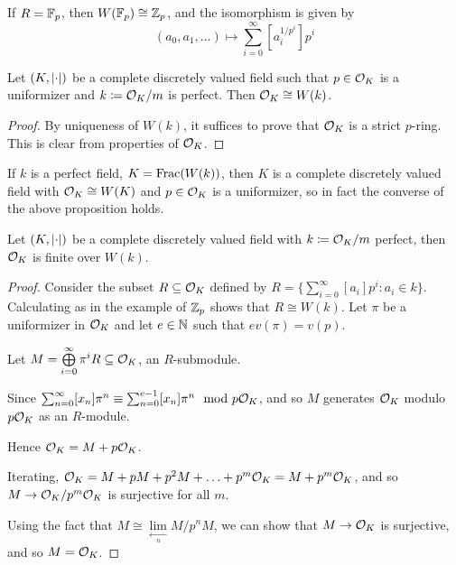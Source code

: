 \documentclass[10pt,a4paper]{article}
\begin{document}
If $R = \mathbb{F}_p$, then $W(\mathbb{F}_p) \cong \mathbb{Z}_p$, and the isomorphism is given by
\[(a_0, a_1, \ldots) \mapsto \sum_{i=0}^\infty \left[a_i^{1/p^i}\right]p^i\]

\begin{proposition}
  Let $(K, \lvert\cdot\rvert)$ be a complete discretely valued field such that $p \in \mathcal{O}_K$ is a uniformizer and $k \coloneqq \mathcal{O}_K/m$ is perfect. Then $\mathcal{O}_K \cong W(k)$.
\end{proposition}
\begin{proof}
  By uniqueness of $W(k)$, it suffices to prove that $\mathcal{O}_K$ is a strict $p$-ring. This is clear from properties of $\mathcal{O}_K$.
\end{proof}

If $k$ is a perfect field, $K = \operatorname{Frac}(W(k))$, then $K$ is a complete discretely valued field with $\mathcal{O}_K \cong W(K)$ and $p \in \mathcal{O}_K$ is a uniformizer, so in fact the converse of the above proposition holds.

\begin{proposition}
  Let $(K, \lvert\cdot\rvert)$ be a complete discretely valued field with $k \coloneqq \mathcal{O}_K/m$ perfect, then $\mathcal{O}_K$ is finite over $W(k)$.
\end{proposition}
\begin{proof}
  Consider the subset $R \subseteq \mathcal{O}_K$ defined by $R = \{\sum_{i=0}^\infty [a_i]p^i : a_i \in k\}$. Calculating as in the example of $\mathbb{Z}_p$ shows that $R \cong W(k)$. Let $\pi$ be a uniformizer in $\mathcal{O}_K$ and let $e \in \mathbb{N}$ such that $ev(\pi) = v(p)$.

  Let $M = \bigoplus\limits_{i=0}^\infty \pi^i R \subseteq \mathcal{O}_K$, an $R$-submodule.

  Since $\sum_{n=0}^\infty [x_n]\pi^n \equiv \sum_{n=0}^{e-1}[x_n]\pi^n \mod p\mathcal{O}_K$, and so $M$ generates $\mathcal{O}_K$ modulo $p\mathcal{O}_K$ as an $R$-module.

  Hence $\mathcal{O}_K = M+p\mathcal{O}_K$.

  Iterating, $\mathcal{O}_K = M+pM+p^2M + \ldots + p^m\mathcal{O}_K = M+p^m \mathcal{O}_K$, and so $M \to \mathcal{O}_K/p^m\mathcal{O}_K$ is surjective for all $m$.

  Using the fact that $M \cong \lim\limits_{\xleftarrow[n]{}} M/p^nM$, we can show that $M \to \mathcal{O}_K$ is surjective, and so $M = \mathcal{O}_K$.
\end{proof}
\end{document}
